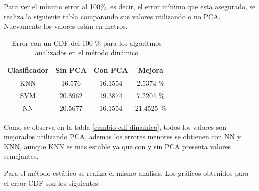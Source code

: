Para ver el mínimo error al 100\%, es decir, el error mínimo que esta asegurado, se realiza la siguiente tabla comparando sus valores utilizando o no PCA. Nuevamente los valores están en metros.

\begin{table}[!h]
\centering
\caption{Error con un CDF del 100 \% para los algoritmos analizados  en el método dinámico}
\label{cambio-cdf-dinamico}
\begin{tabular}{|c|c|c|c|}
\hline
Clasificador & Sin PCA & Con PCA & Mejora     \\ \hline
KNN          & 16.576  & 16.1554 & 2.5374 \%  \\ \hline
SVM          & 20.8962 & 19.3874 & 7.2204 \%  \\ \hline
NN           & 20.5677 & 16.1554 & 21.4525 \% \\ \hline
\end{tabular}
\end{table}


Como se observa en la tabla \autoref{cambio-cdf-dinamico}, todos los valores son mejorados utilizando PCA, ademas los errores menores se obtienen con NN y KNN, aunque KNN es mas estable ya que con y sin PCA presenta valores semejantes.

Para el método estático se realiza el mismo análisis. Los gráficos obtenidos para el error CDF son los siguientes:


